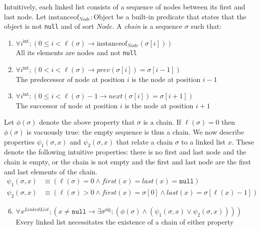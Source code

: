 \documentclass[runningheads]{llncs}
\begin{document}
Intuitively, each linked list consists of a sequence of nodes between its first and last node. Let $\mathrm{instanceof}_\mathit{Node}: \mathrm{Object}$ be a built-in predicate that states that the object is not \texttt{null} and of sort $\mathit{Node}$. A \emph{chain} is a sequence $\sigma$ such that:

\begin{enumerate}[label=(\alph*)]
    \item\label{item:node} $\forall i^\mathrm{int}; (0\leq i<\ell(\sigma)\to \mathrm{instanceof}_\mathit{Node}(\sigma[i]))$\\
    All its elements are nodes and not \texttt{null}
    \item\label{item:prev} $\forall i^\mathrm{int}; (0<i<\ell(\sigma)\to \mathit{prev}(\sigma[i]) = \sigma[i-1])$\\
    The predecessor of node at position $i$ is the node at position $i-1$
    \item\label{item:next} $\forall i^\mathrm{int}: (0\leq i<\ell(\sigma)-1\to \mathit{next}(\sigma[i]) = \sigma[i+1])$\\
    The successor of node at position $i$ is the node at position $i+1$
\end{enumerate}

Let $\phi(\sigma)$ denote the above property that $\sigma$ is a chain. If $\ell(\sigma)=0$ then $\phi(\sigma)$ is vacuously true: the empty sequence is thus a chain. We now describe properties $\psi_1(\sigma,x)$ and $\psi_2(\sigma,x)$ that relate a chain $\sigma$ to a linked list $x$. These denote the following intuitive properties: there is no first and last node and the chain is empty, or the chain is not empty and the first and last node are the first and last elements of the chain. \begin{equation*}
\begin{split}
\psi_1(\sigma,x) & \equiv (\ell(\sigma) = 0 \land \mathit{first}(x) = \mathit{last}(x) = \mathtt{null}) \\
\psi_2(\sigma,x) & \equiv (\ell(\sigma) > 0 \land \mathit{first}(x) = \sigma[0] \land \mathit{last}(x) = \sigma[\ell(x)-1])
\end{split}
\end{equation*}
\begin{enumerate}\setcounter{enumi}{5}
    \item $\forall x^\mathit{LinkedList}; (x \neq \mathtt{null}\to \exists \sigma^\mathrm{sig}; (\phi(\sigma) \land (\psi_1(\sigma,x)\lor\psi_2(\sigma,x))))$\\
    Every linked list necessitates the existence of a chain of either property
\end{enumerate}
\end{document}
